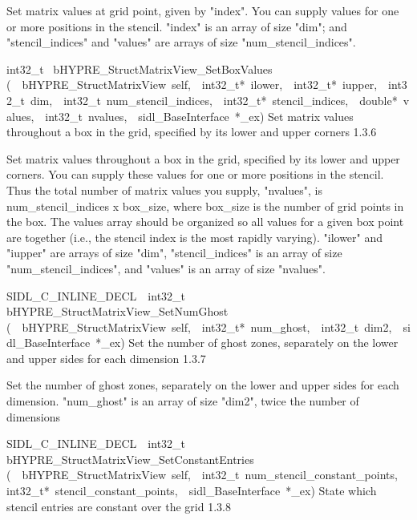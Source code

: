 \documentclass{article}
\begin{document}
\begin{cxxentry}
\begin{cxxentry}
\begin{cxxfunction}
\begin{cxxdoc}
Set matrix values at grid point, given by "index".
You can supply values for one or more positions in the stencil.
"index" is an array of size "dim"; and "stencil\_indices" and "values"
are arrays of size "num\_stencil\_indices".
\end{cxxdoc}
\end{cxxfunction}
\begin{cxxfunction}
{int32\_t\ }
        {bHYPRE\_StructMatrixView\_SetBoxValues}
        {(\ \ bHYPRE\_StructMatrixView\ self,\ \ int32\_t*\ ilower,\ \ int32\_t*\ iupper,\ \ int32\_t\ dim,\ \ int32\_t\ num\_stencil\_indices,\ \ int32\_t*\ stencil\_indices,\ \ double*\ values,\ \ int32\_t\ nvalues,\ \ sidl\_BaseInterface\ *\_ex)}
        {
Set matrix values throughout a box in the grid, specified by its lower
and upper corners}
        {1.3.6}
\begin{cxxdoc}

Set matrix values throughout a box in the grid, specified by its lower
and upper corners.  You can supply these values for one or more positions
in the stencil.  Thus the total number of matrix values you supply,
"nvalues", is num\_stencil\_indices x box\_size, where box\_size is the
number of grid points in the box.  The values array should be organized
so all values for a given box point are together (i.e., the stencil
index is the most rapidly varying).
"ilower" and "iupper" are arrays of size "dim", "stencil\_indices" is an
array of size "num\_stencil\_indices", and "values" is an array of size
"nvalues". 
\end{cxxdoc}
\end{cxxfunction}
\begin{cxxfunction}
{SIDL\_C\_INLINE\_DECL\ \ int32\_t\ }
        {bHYPRE\_StructMatrixView\_SetNumGhost}
        {(\ \ bHYPRE\_StructMatrixView\ self,\ \ int32\_t*\ num\_ghost,\ \ int32\_t\ dim2,\ \ sidl\_BaseInterface\ *\_ex)}
        {
Set the number of ghost zones, separately on the lower and upper sides
for each dimension}
        {1.3.7}
\begin{cxxdoc}

Set the number of ghost zones, separately on the lower and upper sides
for each dimension.
"num\_ghost" is an array of size "dim2", twice the number of dimensions
\end{cxxdoc}
\end{cxxfunction}
\begin{cxxfunction}
{SIDL\_C\_INLINE\_DECL\ \ int32\_t\ }
        {bHYPRE\_StructMatrixView\_SetConstantEntries}
        {(\ \ bHYPRE\_StructMatrixView\ self,\ \ int32\_t\ num\_stencil\_constant\_points,\ \ int32\_t*\ stencil\_constant\_points,\ \ sidl\_BaseInterface\ *\_ex)}
        {
State which stencil entries are constant over the grid}
        {1.3.8}
\begin{cxxdoc}


\end{cxxdoc}
\end{cxxfunction}
\end{cxxentry}
\end{cxxentry}
\end{document}
